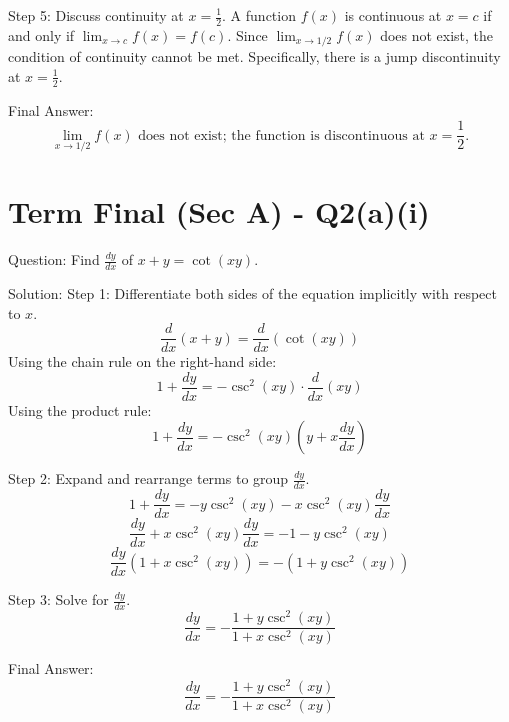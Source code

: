 \documentclass{article}
\begin{document}
Step 5: Discuss continuity at $x = \frac{1}{2}$.
A function $f(x)$ is continuous at $x = c$ if and only if $\lim_{x \to c} f(x) = f(c)$.
Since $\lim_{x \to 1/2} f(x)$ does not exist, the condition of continuity cannot be met. Specifically, there is a jump discontinuity at $x = \frac{1}{2}$.

Final Answer:
\[
\boxed{\lim_{x \to 1/2} f(x) \text{ does not exist; the function is discontinuous at } x = \frac{1}{2}.}
\]

\section*{Term Final (Sec A) - Q2(a)(i)}
Question:
Find $\frac{dy}{dx}$ of $x+y = \cot(xy)$.

Solution:
Step 1: Differentiate both sides of the equation implicitly with respect to $x$.
\[
\frac{d}{dx}(x + y) = \frac{d}{dx}(\cot(xy))
\]
Using the chain rule on the right-hand side:
\[
1 + \frac{dy}{dx} = -\csc^2(xy) \cdot \frac{d}{dx}(xy)
\]
Using the product rule:
\[
1 + \frac{dy}{dx} = -\csc^2(xy) \left( y + x \frac{dy}{dx} \right)
\]

Step 2: Expand and rearrange terms to group $\frac{dy}{dx}$.
\[
1 + \frac{dy}{dx} = -y \csc^2(xy) - x \csc^2(xy) \frac{dy}{dx}
\]
\[
\frac{dy}{dx} + x \csc^2(xy) \frac{dy}{dx} = -1 - y \csc^2(xy)
\]
\[
\frac{dy}{dx} \left( 1 + x \csc^2(xy) \right) = -\left( 1 + y \csc^2(xy) \right)
\]

Step 3: Solve for $\frac{dy}{dx}$.
\[
\frac{dy}{dx} = -\frac{1 + y \csc^2(xy)}{1 + x \csc^2(xy)}
\]

Final Answer:
\[
\boxed{\frac{dy}{dx} = -\frac{1 + y \csc^2(xy)}{1 + x \csc^2(xy)}}
\]

\end{document}
